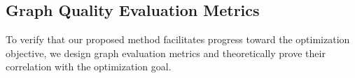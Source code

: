 \documentclass[11pt]{article}
\begin{document}

\subsection{Graph Quality Evaluation Metrics}
To verify that our proposed method facilitates progress toward the optimization objective, we design graph evaluation metrics and theoretically prove their correlation with the optimization goal. 
\end{document}
